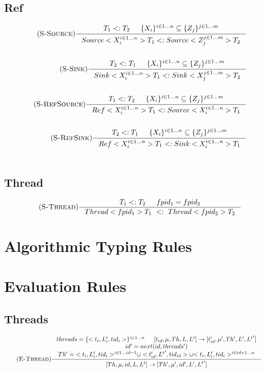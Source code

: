 \documentclass[12pt]{article}
\begin{document}
\subsection{Ref}
\begin{align*}
    \tag{\textsc{S-Source}}
    \inference[]{T_1 <: T_2 & \{X_i\}^{i\in 1...n} \subseteq   \{Z_j\}^{j\in 1...m}}{Source<X_i^{i\in 1...n}>T_1 <: Source<Z_j^{j\in 1...m}>T_2}
    \\
    \\
    \tag{\textsc{S-Sink}}
    \inference[]{T_2 <: T_1 & \{X_i\}^{i\in 1...n} \subseteq   \{Z_j\}^{j\in 1...m}}{Sink<X_i^{i\in 1...n}>T_1 <: Sink<X_j^{j\in 1...m}>T_2}
    \\
    \\
    \tag{\textsc{S-RefSource}}
    \inference[]{T_1<:T_2 & \{X_i\}^{i\in 1...n} \subseteq   \{Z_j\}^{j\in 1...m}}{
    Ref<X_i^{i\in 1...n}>T_1 <: Source<X_i^{i\in 1...n}>T_1}
    \\
    \\
    \tag{\textsc{S-RefSink}}
    \inference[]{T_2<:T_1 & \{X_i\}^{i\in 1...n} \subseteq   \{Z_j\}^{j\in 1...m}}
    {Ref<X_i^{i\in 1...n}>T_1 <: Sink<X_i^{i\in 1...n}>T_1}
    \\
    \\
\end{align*}
\subsection{Thread}
\begin{align*}
    \tag {\textsc{S-Thread}}
    \inference[]{T_1 <: T_2 & fpid_1  = fpid_2}{ Thread<fpid_1>T_1~<:~Thread<fpid_2>T_2}
\end{align*}

\section{Algorithmic Typing Rules}


\section{Evaluation Rules}

\subsection{Threads}
\begin{align*}
    \tag{\textsc{E-Thread}}
    \inference[]{threads = \{<t_i,L^t_i,tid_i>\}^{i\in 1...n} & [t_{id},\mu,Th,L,L^t] -> [t_{id}',\mu',Th',L',{L^t}']\\
     id' = next(id,threads') \\ Th' = {<t_i,L_i^t,tid_i>^{i\in 1...id-1}}\cup<t_{id}',{L^t}',tid_{id}>\cup{<t_i,L_i^t,tid_i>^{i\in id+1...n}}}{[Th,\mu,id,L,L^t]->[Th',\mu',id',L',{L^t}']}
    \\
    \\
\end{align*}
\end{document}
